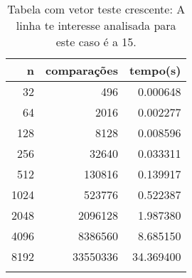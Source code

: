 \begin{table}[ht]
\centering
\begin{tabular}{rrr} \toprule
        n &    comparações &       tempo(s) \\ \midrule
      32  &            496 &      0.000648 \\
      64  &           2016 &      0.002277 \\
     128  &           8128 &      0.008596 \\
     256  &          32640 &      0.033311 \\
     512  &         130816 &      0.139917 \\
    1024  &         523776 &      0.522387 \\
    2048  &        2096128 &      1.987380 \\
    4096  &        8386560 &      8.685150 \\
    8192  &       33550336 &     34.369400 \\
\bottomrule\addlinespace
\end{tabular}
\caption{Tabela com vetor teste crescente: A linha te interesse analisada para este caso é a 15.}
\label{tab:selectionsortCrescente}
\end{table}
